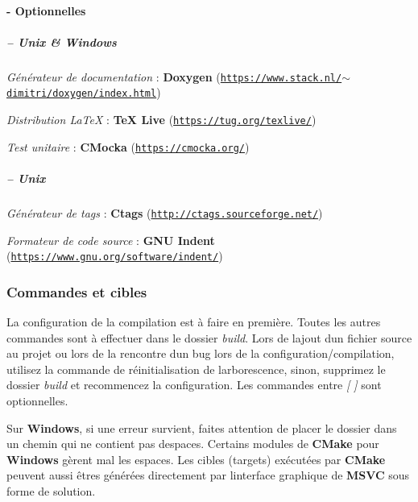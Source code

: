 \paragraph*{-\/ Optionnelles}

\subparagraph*{-- Unix \& Windows}


\begin{DoxyItemize}
\item {\itshape Générateur de documentation} \+: {\bfseries Doxygen} (\href{https://www.stack.nl/~dimitri/doxygen/index.html}{\tt https\+://www.\+stack.\+nl/$\sim$dimitri/doxygen/index.\+html})
\item {\itshape Distribution La\+TeX} \+: {\bfseries TeX Live} (\href{https://tug.org/texlive/}{\tt https\+://tug.\+org/texlive/})
\item {\itshape Test unitaire} \+: {\bfseries C\+Mocka} (\href{https://cmocka.org/}{\tt https\+://cmocka.\+org/})
\end{DoxyItemize}

\subparagraph*{-- Unix}


\begin{DoxyItemize}
\item {\itshape Générateur de tags} \+: {\bfseries Ctags} (\href{http://ctags.sourceforge.net/}{\tt http\+://ctags.\+sourceforge.\+net/})
\item {\itshape Formateur de code source} \+: {\bfseries G\+NU Indent} (\href{https://www.gnu.org/software/indent/}{\tt https\+://www.\+gnu.\+org/software/indent/})
\end{DoxyItemize}

\subsubsection*{Commandes et cibles }

La configuration de la compilation est à faire en première. Toutes les autres commandes sont à effectuer dans le dossier {\itshape build}. Lors de l\textquotesingle{}ajout d\textquotesingle{}un fichier source au projet ou lors de la rencontre d\textquotesingle{}un bug lors de la configuration/compilation, utilisez la commande de réinitialisation de l\textquotesingle{}arborescence, sinon, supprimez le dossier {\itshape build} et recommencez la configuration. Les commandes entre {\itshape \mbox{[} \mbox{]}} sont optionnelles.

Sur {\bfseries Windows}, si une erreur survient, faites attention de placer le dossier dans un chemin qui ne contient pas d\textquotesingle{}espaces. Certains modules de {\bfseries C\+Make} pour {\bfseries Windows} gèrent mal les espaces. Les cibles (targets) exécutées par {\bfseries C\+Make} peuvent aussi êtres générées directement par l\textquotesingle{}interface graphique de {\bfseries M\+S\+VC} sous forme de solution.

